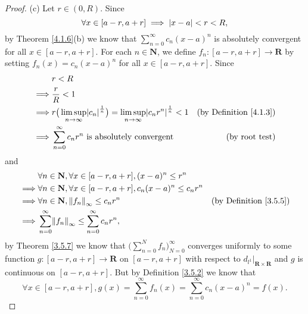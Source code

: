 \begin{proof}{(c)}
    Let \(r \in (0, R)\).
    Since
    \[
        \forall x \in [a - r, a + r] \implies \abs*{x - a} < r < R,
    \]
    by Theorem \ref{4.1.6}(b) we know that \(\sum_{n = 0}^\infty c_n (x - a)^n\) is absolutely convergent for all \(x \in [a - r, a + r]\).
    For each \(n \in \mathbf{N}\), we define \(f_n : [a - r, a + r] \to \mathbf{R}\) by setting \(f_n(x) = c_n (x - a)^n\) for all \(x \in [a - r, a + r]\).
    Since
    \begin{align*}
                 & r < R                                                                                                                                                      \\
        \implies & \frac{r}{R} < 1                                                                                                                                            \\
        \implies & r \big(\limsup_{n \to \infty} \abs*{c_n}^{\frac{1}{n}}\big) = \limsup_{n \to \infty} \abs*{c_n r^n}^{\frac{1}{n}} < 1 & \text{(by Definition \ref{4.1.3})} \\
        \implies & \sum_{n = 0}^\infty c_n r^n \text{ is absolutely convergent}                                                          & \text{(by root test)}
    \end{align*}
    and
    \begin{align*}
                 & \forall n \in \mathbf{N}, \forall x \in [a - r, a + r], (x - a)^n \leq r^n                                              \\
        \implies & \forall n \in \mathbf{N}, \forall x \in [a - r, a + r], c_n (x - a)^n \leq c_n r^n                                      \\
        \implies & \forall n \in \mathbf{N}, \norm*{f_n}_\infty \leq c_n r^n                          & \text{(by Definition \ref{3.5.5})} \\
        \implies & \sum_{n = 0}^\infty \norm*{f_n}_\infty \leq \sum_{n = 0}^\infty c_n r^n,
    \end{align*}
    by Theorem \ref{3.5.7} we know that \(\big(\sum_{n = 0}^N f_n\big)_{N = 0}^\infty\) converges uniformly to some function \(g : [a - r, a + r] \to \mathbf{R}\) on \([a - r, a + r]\) with respect to \(d_{l^1}|_{\mathbf{R} \times \mathbf{R}}\) and \(g\) is continuous on \([a - r, a + r]\).
    But by Definition \ref{3.5.2} we know that
    \[
        \forall x \in [a - r, a + r], g(x) = \sum_{n = 0}^\infty f_n(x) = \sum_{n = 0}^\infty c_n (x - a)^n = f(x).
\]
\end{proof}
